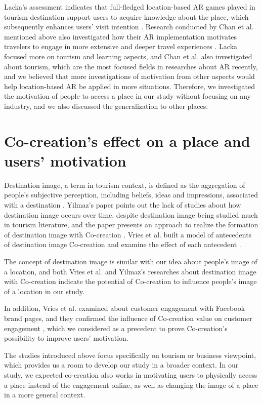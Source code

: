 Lacka's assessment indicates that full-fledged location-based AR games played in tourism destination support users to acquire knowledge about the place,
which subsequently enhances users' visit intention \cite{lacka_2018}.
Research conducted by Chan et al. mentioned above also investigated how their AR implementation motivates travelers to engage in more extensive and deeper travel experiences \cite{chan_lin_wang_lu_hsu_2017}.
Lacka focused more on tourism and learning aspects, and Chan et al. also investigated about tourism, which are the most focused fields in researches about AR recently,
and we believed that more investigations of motivation from other aspects would help location-based AR be applied in more situations.
Therefore, we investigated the motivation of people to access a place in our study without focusing on any industry, and we also discussed the generalization to other places.

\section{Co-creation's effect on a place and users' motivation}
Destination image, a term in tourism context, is defined as the aggregation of people's subjective perception,
including beliefs, ideas and impressions, associated with a destination \cite{kotler_haider_rein_2008}\cite{Lopes2011DestinationIO}.
Yilmaz's paper points out the lack of studies about how destination image occurs over time, despite destination image being studied much in tourism literature,
and the paper presents an approach to realize the formation of destination image with Co-creation \cite{yilmaz_2021}.
Vries et al. built a model of antecedents of destination image Co-creation and examine the effect of each antecedent \cite{glyptou_2021}.

The concept of destination image is similar with our idea about people's image of a location,
and both Vries et al. and Yilmaz's researches about destination image with Co-creation indicate the potential of Co-creation to influence people's image of a location in our study.

In addition, Vries et al. examined about customer engagement with Facebook brand pages, and they confirmed the influence of Co-creation value on customer engagement \cite{vries_carlson_2014},
which we considered as a precedent to prove Co-creation's possibility to improve users' motivation.

The studies introduced above focus specifically on tourism or business viewpoint, which provides us a room to develop our study in a broader context.
In our study, we expected co-creation also works in motivating users to physically access a place instead of the engagement online, as well as changing the image of a place in a more general context.

